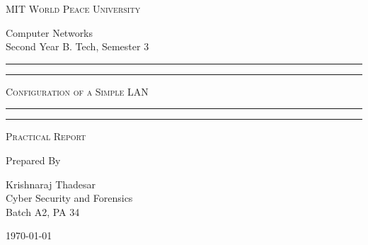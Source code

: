\documentclass[11pt]{article}
\begin{document}
	
	\begin{titlepage} 
		\centering 
		
		
		\huge\textsc{
			MIT World Peace University
		}\\
	
		\vspace{0.75\baselineskip} %
		
		\LARGE{
			Computer Networks\\
			Second Year B. Tech, Semester 3
		}
		
		\vfill %
		
		
		\rule{\textwidth}{1.6pt}\vspace*{-\baselineskip}\vspace*{2pt}
		\rule{\textwidth}{0.6pt}
		\vspace{0.75\baselineskip} %
		
		
		
		\huge{\textsc{
			Configuration of a Simple LAN
			}} \\
		
		
		
		\vspace{0.5\baselineskip} %
		\rule{\textwidth}{0.6pt}\vspace*{-\baselineskip}\vspace*{2.8pt}
		\rule{\textwidth}{1.6pt}
		
		\vspace{1\baselineskip} %

			
		\LARGE\textsc{
			Practical Report
		} %
		\vfill
		
		
		Prepared By
		\vspace{0.5\baselineskip} %
		
		\Large{
			Krishnaraj Thadesar \\
			Cyber Security and Forensics\\
			Batch A2, PA 34
		}
		
		
		\vspace{0.5\baselineskip} %
		\today

	\end{titlepage}
	
\end{document}
